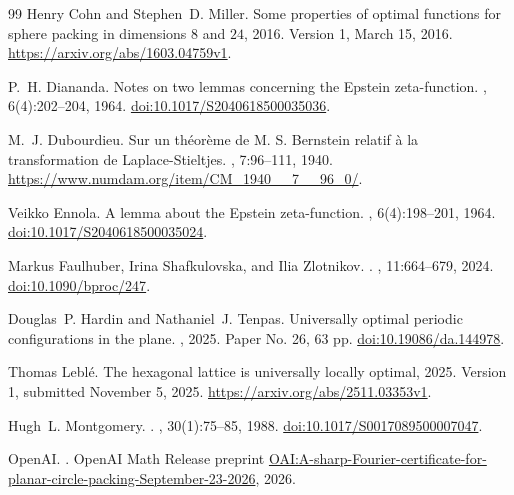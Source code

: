 \documentclass[11pt]{article}
\theoremstyle{remark}\newtheorem{remark}[theorem]{Remark}
\begin{document}
\begin{thebibliography}{99}
Henry Cohn and Stephen~D. Miller.
\newblock Some properties of optimal functions for sphere packing in dimensions
  {$8$} and {$24$}, 2016.
\newblock Version 1, March 15, 2016.
\newblock \url{https://arxiv.org/abs/1603.04759v1}.

P.~H. Diananda.
\newblock Notes on two lemmas concerning the {Epstein} zeta-function.
,
  6(4):202--204, 1964.
\newblock \href{https://doi.org/10.1017/S2040618500035036}{doi:10.1017/S2040618500035036}.

M.~J. Dubourdieu.
\newblock Sur un th{\'e}or{\`e}me de {M.} {S.} {Bernstein} relatif
  {\`a} la transformation de {Laplace-Stieltjes}.
, 7:96--111, 1940.
\newblock \url{https://www.numdam.org/item/CM_1940__7__96_0/}.

Veikko Ennola.
\newblock A lemma about the {Epstein} zeta-function.
,
  6(4):198--201, 1964.
\newblock \href{https://doi.org/10.1017/S2040618500035024}{doi:10.1017/S2040618500035024}.

Markus Faulhuber, Irina Shafkulovska, and Ilia Zlotnikov.
.
,
  11:664--679, 2024.
\newblock \href{https://doi.org/10.1090/bproc/247}{doi:10.1090/bproc/247}.

Douglas~P. Hardin and Nathaniel~J. Tenpas.
\newblock Universally optimal periodic configurations in the plane.
, 2025.
\newblock Paper No. 26, 63 pp.
\newblock \href{https://doi.org/10.19086/da.144978}{doi:10.19086/da.144978}.

Thomas Lebl{\'e}.
\newblock The hexagonal lattice is universally locally optimal, 2025.
\newblock Version 1, submitted November 5, 2025.
\newblock \url{https://arxiv.org/abs/2511.03353v1}.

Hugh~L. Montgomery.
.
, 30(1):75--85, 1988.
\newblock \href{https://doi.org/10.1017/S0017089500007047}{doi:10.1017/S0017089500007047}.

OpenAI.
.
\newblock OpenAI Math Release preprint
\href{https://github.com/openai/math/blob/main/preprints/A-sharp-Fourier-certificate-for-planar-circle-packing-September-23-2026/paper.pdf}{OAI:A-sharp-Fourier-certificate-for-planar-circle-packing-September-23-2026}, 2026.


\end{thebibliography}
\end{document}
